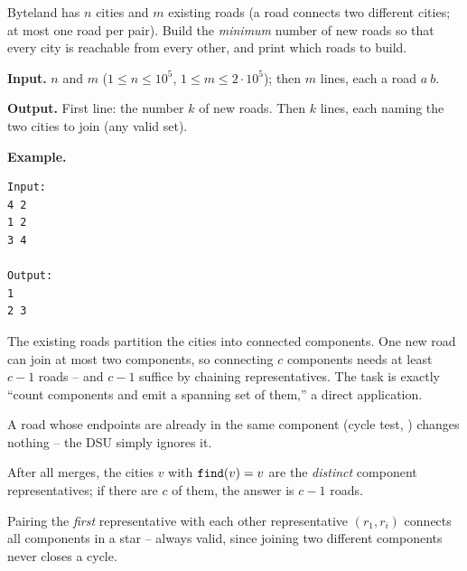 \begin{problemstatement}
Byteland has \(n\) cities and \(m\) existing roads (a road connects two
different cities; at most one road per pair).  Build the \emph{minimum} number
of new roads so that every city is reachable from every other, and print which
roads to build.

\textbf{Input.} \(n\) and \(m\) (\(1\le n\le 10^5\), \(1\le m\le 2\cdot 10^5\));
then \(m\) lines, each a road \(a\ b\).

\textbf{Output.} First line: the number \(k\) of new roads.  Then \(k\) lines,
each naming the two cities to join (any valid set).

\textbf{Example.}
\begin{verbatim}
Input:
4 2
1 2
3 4

Output:
1
2 3
\end{verbatim}
\end{problemstatement}

\begin{attemptgate}
\end{attemptgate}

The existing roads partition the cities into connected components.  One new
road can join at most two components, so connecting \(c\) components needs at
least \(c-1\) roads -- and \(c-1\) suffice by chaining representatives.  The
task is exactly ``count components and emit a spanning set of them,'' a direct
 application.

\begin{observation}
A road whose endpoints are already in the same component (cycle test,
) changes nothing -- the DSU simply ignores it.
\end{observation}
\begin{observation}
After all merges, the cities \(v\) with \(\texttt{find}(v)=v\) are the
\emph{distinct} component representatives; if there are \(c\) of them, the
answer is \(c-1\) roads.
\end{observation}
\begin{observation}
Pairing the \emph{first} representative with each other representative
\((r_1,r_i)\) connects all components in a star -- always valid, since joining
two different components never closes a cycle.
\end{observation}

